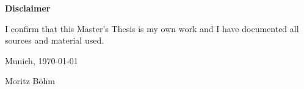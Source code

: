\cleardoublepage{}

\thispagestyle{empty}

\vspace*{0.5\textheight}
\noindent

\makeatletter

\begin{center}
    {\textbf{Disclaimer}}
\end{center}

\begin{flushleft}
    {I confirm that this Master's Thesis is my own work and I have documented all sources and material used.}

    \makeatother

    \vspace{15mm}
    \noindent

    Munich, \today{}

    Moritz Böhm
\end{flushleft}

\cleardoublepage{}
